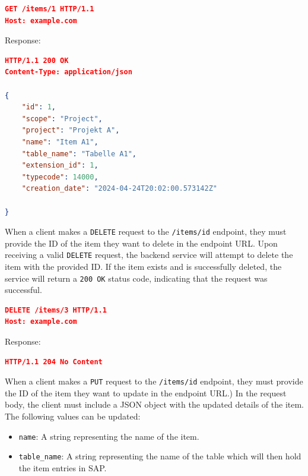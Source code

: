 \begin{lstlisting}[language=json,label={lst:lstlisting9}]
GET /items/1 HTTP/1.1
Host: example.com
\end{lstlisting}

Response:

\begin{lstlisting}[language=json,label={lst:lstlisting10}]
HTTP/1.1 200 OK
Content-Type: application/json

{
    "id": 1,
    "scope": "Project",
    "project": "Projekt A",
    "name": "Item A1",
    "table_name": "Tabelle A1",
    "extension_id": 1,
    "typecode": 14000,
    "creation_date": "2024-04-24T20:02:00.573142Z"

}
\end{lstlisting}


When a client makes a \texttt{DELETE} request to the \texttt{/items/{id}} endpoint, they must provide the ID of the item they want to delete in the endpoint URL.
Upon receiving a valid \texttt{DELETE} request, the backend service will attempt to delete the item with the provided ID.
If the item exists and is successfully deleted, the service will return a \texttt{200 OK} status code, indicating that the request was successful.

\begin{lstlisting}[language=json,label={lst:lstlisting7}]
DELETE /items/3 HTTP/1.1
Host: example.com
\end{lstlisting}

Response:

\begin{lstlisting}[language=json,label={lst:lstlisting8}]
HTTP/1.1 204 No Content
\end{lstlisting}


When a client makes a \texttt{PUT} request to the \texttt{/items/{id}} endpoint, they must provide the ID of the item they want to update in the endpoint URL.)
In the request body, the client must include a JSON object with the updated details of the item.
The following values can be updated:
\begin{itemize}
    \item \texttt{name}: A string representing the name of the item.
    \item \texttt{table\_name}: A string representing the name of the table which will then hold the item entries in SAP.
\end{itemize}

